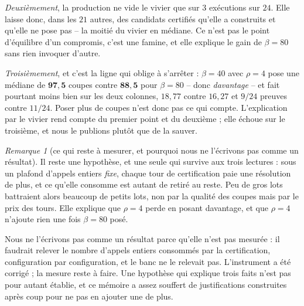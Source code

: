 \documentclass[11pt,a4paper]{article}
\theoremstyle{plain}
\theoremstyle{remark}
\newtheorem{remark}{Remarque}
\begin{document}
\emph{Deuxièmement}, la production ne vide le vivier que sur $3$ exécutions
sur $24$. Elle laisse donc, dans les $21$ autres, des candidats certifiés
qu'elle a construits et qu'elle ne pose pas -- la moitié du vivier en
médiane. Ce n'est pas le point d'équilibre d'un compromis, c'est une
famine, et elle explique le gain de $\beta=80$ sans rien invoquer d'autre.

\emph{Troisièmement}, et c'est la ligne qui oblige à s'arrêter : $\beta=40$
avec $\rho=4$ pose une médiane de $\mathbf{97{,}5}$ coupes contre
$\mathbf{88{,}5}$ pour $\beta=80$ -- donc \emph{davantage} -- et fait
pourtant moins bien sur les deux colonnes, $18{,}77$ contre $16{,}27$ et
$9/24$ preuves contre $11/24$. Poser plus de coupes n'est donc pas ce qui
compte. L'explication par le vivier rend compte du premier point et du
deuxième ; elle échoue sur le troisième, et nous le publions plutôt que de
la sauver.

\begin{remark}[ce qui reste à mesurer, et pourquoi nous ne l'écrivons pas
comme un résultat]
\label{rem:prixdestours}
Il reste une hypothèse, et une seule qui survive aux trois lectures : sous
un plafond d'appels entiers \emph{fixe}, chaque tour de certification paie
une résolution de plus, et ce qu'elle consomme est autant de retiré au
reste. Peu de gros lots battraient alors beaucoup de petits lots, non par
la qualité des coupes mais par le prix des tours. Elle explique que
$\rho=4$ perde en posant davantage, et que $\rho=4$ n'ajoute rien une fois
$\beta=80$ posé.

Nous ne l'écrivons pas comme un résultat parce qu'elle n'est pas mesurée :
il faudrait relever le nombre d'appels entiers consommés par la
certification, configuration par configuration, et le banc ne le relevait
pas. L'instrument a été corrigé ; la mesure reste à faire. Une hypothèse
qui explique trois faits n'est pas pour autant établie, et ce mémoire a
assez souffert de justifications construites après coup pour ne pas en
ajouter une de plus.
\end{remark}
\end{document}
